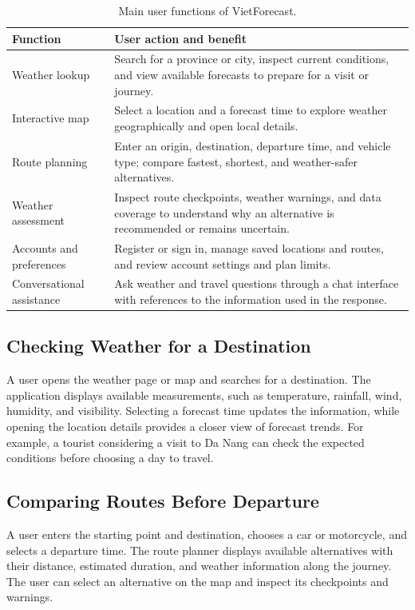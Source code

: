 \begin{table}[H]
\centering
\caption{Main user functions of VietForecast.}
\label{tab:use_case_summary_en}
\small
\renewcommand{\arraystretch}{1.12}
\begin{tabularx}{\textwidth}{>{\raggedright\arraybackslash}p{3.0cm} >{\raggedright\arraybackslash}X}
\toprule
\textbf{Function} & \textbf{User action and benefit} \\
\midrule
Weather lookup & Search for a province or city, inspect current conditions, and view available forecasts to prepare for a visit or journey. \\
Interactive map & Select a location and a forecast time to explore weather geographically and open local details. \\
Route planning & Enter an origin, destination, departure time, and vehicle type; compare fastest, shortest, and weather-safer alternatives. \\
Weather assessment & Inspect route checkpoints, weather warnings, and data coverage to understand why an alternative is recommended or remains uncertain. \\
Accounts and preferences & Register or sign in, manage saved locations and routes, and review account settings and plan limits. \\
Conversational assistance & Ask weather and travel questions through a chat interface with references to the information used in the response. \\
\bottomrule
\end{tabularx}
\end{table}

\subsection{Checking Weather for a Destination}
A user opens the weather page or map and searches for a destination. The application displays available measurements, such as temperature, rainfall, wind, humidity, and visibility. Selecting a forecast time updates the information, while opening the location details provides a closer view of forecast trends. For example, a tourist considering a visit to Da Nang can check the expected conditions before choosing a day to travel.

\subsection{Comparing Routes Before Departure}
A user enters the starting point and destination, chooses a car or motorcycle, and selects a departure time. The route planner displays available alternatives with their distance, estimated duration, and weather information along the journey. The user can select an alternative on the map and inspect its checkpoints and warnings.

